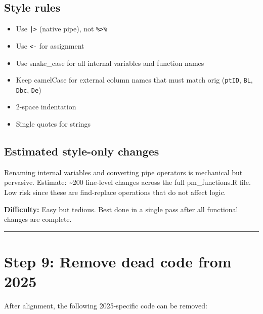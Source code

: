 \documentclass[11pt]{article}
\begin{document}
\subsection{Style rules}

\begin{itemize}
  \item Use \texttt{|>} (native pipe), not \texttt{\%>\%}
  \item Use \texttt{<-} for assignment
  \item Use snake\_case for all internal variables and function names
  \item Keep camelCase for external column names that must match orig
    (\texttt{ptID}, \texttt{BL}, \texttt{Dbc}, \texttt{De})
  \item 2-space indentation
  \item Single quotes for strings
\end{itemize}

\subsection{Estimated style-only changes}

Renaming internal variables and converting pipe operators is
mechanical but pervasive. Estimate: \textasciitilde 200 line-level changes across
the full pm\_functions.R file. Low risk since these are find-replace
operations that do not affect logic.

\textbf{Difficulty:} Easy but tedious. Best done in a single pass after
all functional changes are complete.

\bigskip\noindent\rule{\textwidth}{0.4pt}\bigskip

\section{Step 9: Remove dead code from 2025}

After alignment, the following 2025-specific code can be removed:
\end{document}
